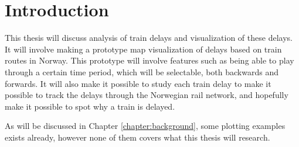 
\chapter{Introduction}
\label{chapter:introduction}

This thesis will discuss analysis of train delays and visualization of these
delays. It will involve making a prototype map visualization of delays based on
train routes in Norway. This prototype will involve features such as being able
to play through a certain time period, which will be selectable, both backwards
and forwards. It will also make it possible to study each train delay to make
it possible to track the delays through the Norwegian rail network, and
hopefully make it possible to spot why a train is delayed.

As will be discussed in Chapter \vref{chapter:background}, some plotting examples
exists already, however none of them covers what this thesis will research.
